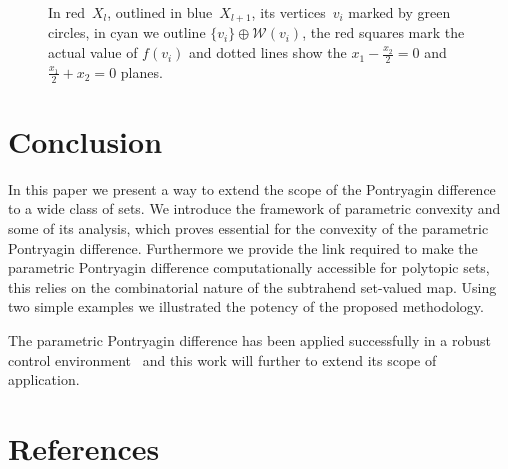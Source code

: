 \documentclass[final]{elsarticle}
\theoremstyle{remark}
\theoremstyle{definition}
\begin{document}
\begin{figure}
\caption{In red~$X_l$, outlined in blue~$X_{l+1}$, its vertices~$v_i$ marked by green circles, in cyan we outline $\{v_i\}\oplus\mathcal W(v_i)$, the red squares mark the actual value of $f(v_i)$ and dotted lines show the $x_1-\frac{x_2}{2}=0$ and $\frac{x_1}{2}+x_2=0$ planes.}
\label{fig:second:example:resulting:set}
\end{figure}
%
%
%
%
%
\section{Conclusion}\label{sec:conclusion}
%
%
%
In this paper we present a way to extend the scope of the Pontryagin difference to a wide class of sets.
%
We introduce the framework of parametric convexity and some of its analysis, which proves essential for the convexity of the parametric Pontryagin difference.
%
Furthermore we provide the link required to make the parametric Pontryagin difference computationally accessible for polytopic sets, this relies on the combinatorial nature of the subtrahend set-valued map.
%
Using two simple examples we illustrated the potency of the proposed methodology.

The parametric Pontryagin difference has been applied successfully in a robust control environment~\cite{Schaich:2015,Schaich:2015a} and this work will further to extend its scope of application.

\section*{References}


\end{document}
